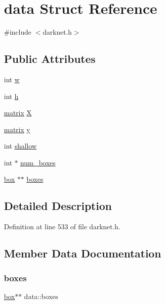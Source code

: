 \hypertarget{structdata}{}\section{data Struct Reference}
\label{structdata}


{\ttfamily \#include $<$darknet.\+h$>$}

\subsection*{Public Attributes}
\begin{DoxyCompactItemize}
\item 
int \mbox{\hyperlink{structdata_a9de96028e1598b323d91ffb059cd48b2}{w}}
\item 
int \mbox{\hyperlink{structdata_adbac4a041922ac9e6c47953f5fa23126}{h}}
\item 
\mbox{\hyperlink{structmatrix}{matrix}} \mbox{\hyperlink{structdata_a1f37ae26b26b12ef5c70a12957826e87}{X}}
\item 
\mbox{\hyperlink{structmatrix}{matrix}} \mbox{\hyperlink{structdata_a30946bde3a05e40df6fbb49c5dd9b627}{y}}
\item 
int \mbox{\hyperlink{structdata_a3ef4c4e942b1f2b6a5e64e7fb7e12491}{shallow}}
\item 
int $\ast$ \mbox{\hyperlink{structdata_afba4d3b06050db7a30b0b11809ae6e23}{num\+\_\+boxes}}
\item 
\mbox{\hyperlink{structbox}{box}} $\ast$$\ast$ \mbox{\hyperlink{structdata_a8379df4ef55945c6fdb778dd581dce55}{boxes}}
\end{DoxyCompactItemize}


\subsection{Detailed Description}


Definition at line 533 of file darknet.\+h.



\subsection{Member Data Documentation}
\mbox{\label{structdata_a8379df4ef55945c6fdb778dd581dce55}} 
\subsubsection{\texorpdfstring{boxes}{boxes}}
{\footnotesize\ttfamily \mbox{\hyperlink{structbox}{box}}$\ast$$\ast$ data\+::boxes}



